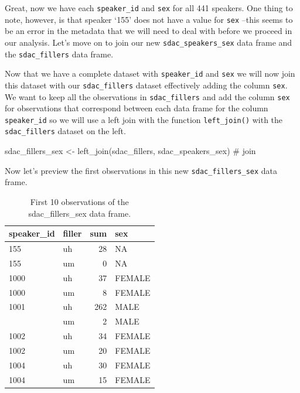 \documentclass[
  letterpaper,
]{latex/krantz}
\newenvironment{Shaded}{\begin{snugshade}}{\end{snugshade}}
\newcommand{\CommentTok}[1]{\textcolor[rgb]{0.37,0.37,0.37}{#1}}
\newcommand{\FunctionTok}[1]{\textcolor[rgb]{0.28,0.35,0.67}{#1}}
\newcommand{\NormalTok}[1]{\textcolor[rgb]{0.00,0.23,0.31}{#1}}
\newcommand{\OtherTok}[1]{\textcolor[rgb]{0.00,0.23,0.31}{#1}}
\begin{document}
Great, now we have each \texttt{speaker\_id} and \texttt{sex} for all
441 speakers. One thing to note, however, is that speaker `155' does not
have a value for \texttt{sex} --this seems to be an error in the
metadata that we will need to deal with before we proceed in our
analysis. Let's move on to join our new \texttt{sdac\_speakers\_sex}
data frame and the \texttt{sdac\_fillers} data frame.

Now that we have a complete dataset with \texttt{speaker\_id} and
\texttt{sex} we will now join this dataset with our
\texttt{sdac\_fillers} dataset effectively adding the column
\texttt{sex}. We want to keep all the observations in
\texttt{sdac\_fillers} and add the column \texttt{sex} for observations
that correspond between each data frame for the column
\texttt{speaker\_id} so we will use a left join with the function
\texttt{left\_join()} with the \texttt{sdac\_fillers} dataset on the
left.

\begin{Shaded}
\begin{Highlighting}[]
\NormalTok{sdac\_fillers\_sex }\OtherTok{\textless{}{-}} 
  \FunctionTok{left\_join}\NormalTok{(sdac\_fillers, sdac\_speakers\_sex) }\CommentTok{\# join}
\end{Highlighting}
\end{Shaded}

Now let's preview the first observations in this new
\texttt{sdac\_fillers\_sex} data frame.

\hypertarget{tbl-i-multi-cont-sdac-fillers-sex-preview}{}
\begin{table}
\caption{\label{tbl-i-multi-cont-sdac-fillers-sex-preview}First 10 observations of the sdac\_fillers\_sex data frame. }\tabularnewline

\centering
\begin{tabular}{llrl}
\toprule
speaker\_id & filler & sum & sex\\
\midrule
155 & uh & 28 & NA\\
155 & um & 0 & NA\\
1000 & uh & 37 & FEMALE\\
1000 & um & 8 & FEMALE\\
1001 & uh & 262 & MALE\\
\addlinespace
1001 & um & 2 & MALE\\
1002 & uh & 34 & FEMALE\\
1002 & um & 20 & FEMALE\\
1004 & uh & 30 & FEMALE\\
1004 & um & 15 & FEMALE\\
\bottomrule
\end{tabular}
\end{table}
\end{document}
